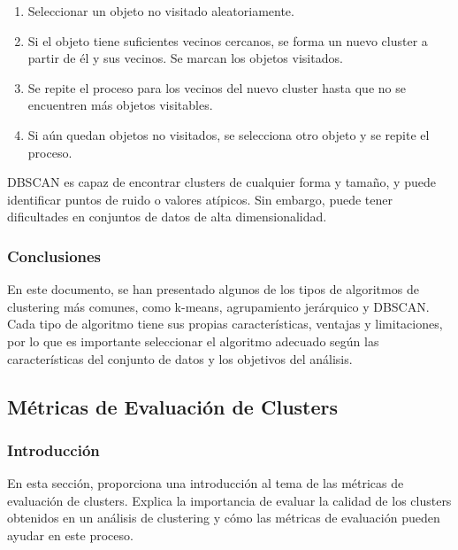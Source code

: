\documentclass{article}
\begin{document}
\begin{enumerate}
  \item Seleccionar un objeto no visitado aleatoriamente.
  \item Si el objeto tiene suficientes vecinos cercanos, se forma un nuevo cluster a partir de él y sus vecinos. Se marcan los objetos visitados.
  \item Se repite el proceso para los vecinos del nuevo cluster hasta que no se encuentren más objetos visitables.
  \item Si aún quedan objetos no visitados, se selecciona otro objeto y se repite el proceso.
\end{enumerate}

DBSCAN es capaz de encontrar clusters de cualquier forma y tamaño, y puede identificar puntos de ruido o valores atípicos. Sin embargo, puede tener dificultades en conjuntos de datos de alta dimensionalidad.
\subsubsection*{Conclusiones}
En este documento, se han presentado algunos de los tipos de algoritmos de clustering más comunes, como k-means, agrupamiento jerárquico y DBSCAN. Cada tipo de algoritmo tiene sus propias características, ventajas y limitaciones, por lo que es importante seleccionar el algoritmo adecuado según las características del conjunto de datos y los objetivos del análisis.

\subsection{Métricas de Evaluación de Clusters}

\subsubsection{Introducción}
En esta sección, proporciona una introducción al tema de las métricas de evaluación de clusters. Explica la importancia de evaluar la calidad de los clusters obtenidos en un análisis de clustering y cómo las métricas de evaluación pueden ayudar en este proceso.
\end{document}
